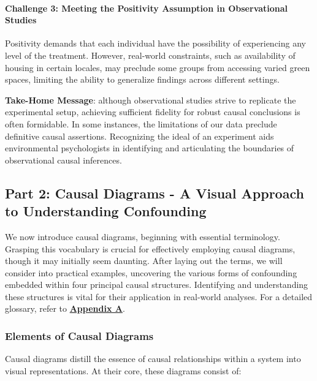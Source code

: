 \documentclass[
  singlecolumn]{article}
\let\oldparagraph\paragraph
\renewcommand{\paragraph}[1]{\oldparagraph{#1}\mbox{}}
\begin{document}
\paragraph{Challenge 3: Meeting the Positivity Assumption in
Observational
Studies}\label{challenge-3-meeting-the-positivity-assumption-in-observational-studies}

Positivity demands that each individual have the possibility of
experiencing any level of the treatment. However, real-world
constraints, such as availability of housing in certain locales, may
preclude some groups from accessing varied green spaces, limiting the
ability to generalize findings across different settings.

\textbf{Take-Home Message}: although observational studies strive to
replicate the experimental setup, achieving sufficient fidelity for
robust causal conclusions is often formidable. In some instances, the
limitations of our data preclude definitive causal assertions.
Recognizing the ideal of an experiment aids environmental psychologists
in identifying and articulating the boundaries of observational causal
inferences.

\subsection{Part 2: Causal Diagrams - A Visual Approach to Understanding
Confounding}\label{part-2-causal-diagrams---a-visual-approach-to-understanding-confounding}

We now introduce causal diagrams, beginning with essential terminology.
Grasping this vocabulary is crucial for effectively employing causal
diagrams, though it may initially seem daunting. After laying out the
terms, we will consider into practical examples, uncovering the various
forms of confounding embedded within four principal causal structures.
Identifying and understanding these structures is vital for their
application in real-world analyses. For a detailed glossary, refer to
\hyperref[appendix-a]{\textbf{Appendix A}}.

\subsubsection{Elements of Causal
Diagrams}\label{elements-of-causal-diagrams}

Causal diagrams distill the essence of causal relationships within a
system into visual representations. At their core, these diagrams
consist of:
\end{document}
